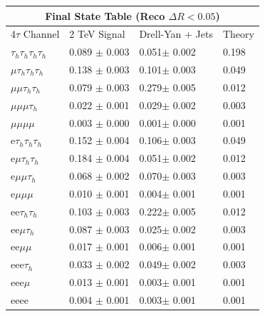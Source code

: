 \documentclass{article}
\begin{document}
 
\begin{landscape} 
\centering 
\begin{tabular}{|p{4.5cm}|p{3cm}|p{3cm}|p{3cm}|}\hline 
\multicolumn{4}{|c|}{Final State Table (Reco \(\Delta R < 0.05\))} \\ 
\hline 
4$\tau$ Channel & 2 TeV Signal & Drell-Yan + Jets & Theory \\ 
\hline 
$\tau_h$$\tau_h$$\tau_h$$\tau_h$ & 0.089 $\pm$ 0.003 & 0.051$\pm$ 0.002 & 0.198\\
\hline 
$\mu$$\tau_h$$\tau_h$$\tau_h$ & 0.138 $\pm$ 0.003 & 0.101$\pm$ 0.003 & 0.049\\
\hline 
$\mu$$\mu$$\tau_h$$\tau_h$ & 0.079 $\pm$ 0.003 & 0.279$\pm$ 0.005 & 0.012\\
\hline 
$\mu$$\mu$$\mu$$\tau_h$ & 0.022 $\pm$ 0.001 & 0.029$\pm$ 0.002 & 0.003\\
\hline 
$\mu$$\mu$$\mu$$\mu$ & 0.003 $\pm$ 0.000 & 0.001$\pm$ 0.000 & 0.001\\
\hline 
e$\tau_h$$\tau_h$$\tau_h$ & 0.152 $\pm$ 0.004 & 0.106$\pm$ 0.003 & 0.049\\
\hline 
e$\mu$$\tau_h$$\tau_h$ & 0.184 $\pm$ 0.004 & 0.051$\pm$ 0.002 & 0.012\\
\hline 
e$\mu$$\mu$$\tau_h$ & 0.068 $\pm$ 0.002 & 0.070$\pm$ 0.003 & 0.003\\
\hline 
e$\mu$$\mu$$\mu$ & 0.010 $\pm$ 0.001 & 0.004$\pm$ 0.001 & 0.001\\
\hline 
ee$\tau_h$$\tau_h$ & 0.103 $\pm$ 0.003 & 0.222$\pm$ 0.005 & 0.012\\
\hline 
ee$\mu$$\tau_h$ & 0.087 $\pm$ 0.003 & 0.025$\pm$ 0.002 & 0.003\\
\hline 
ee$\mu$$\mu$ & 0.017 $\pm$ 0.001 & 0.006$\pm$ 0.001 & 0.001\\
\hline 
eee$\tau_h$ & 0.033 $\pm$ 0.002 & 0.049$\pm$ 0.002 & 0.003\\
\hline 
eee$\mu$ & 0.013 $\pm$ 0.001 & 0.003$\pm$ 0.001 & 0.001\\
\hline 
eeee & 0.004 $\pm$ 0.001 & 0.003$\pm$ 0.001 & 0.001\\
\hline 
\end{tabular} 
\end{landscape} 
\end{document}
